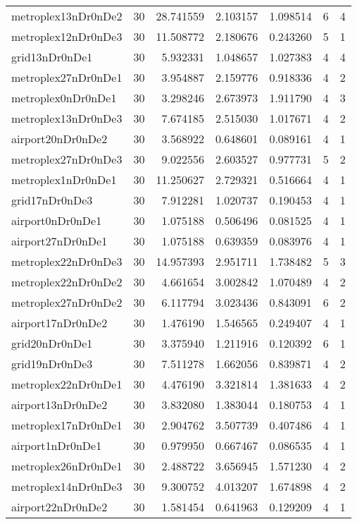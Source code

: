 \documentclass[../../../thesis.tex]{subfiles}
\begin{document}
\begin{longtable}{|l|r|r|r|r|r|r|}
metroplex13nDr0nDe2 & 30 & 28.741559 & 2.103157 & 1.098514 & 6 & 4 \\
metroplex12nDr0nDe3 & 30 & 11.508772 & 2.180676 & 0.243260 & 5 & 1 \\
grid13nDr0nDe1 & 30 & 5.932331 & 1.048657 & 1.027383 & 4 & 4 \\
metroplex27nDr0nDe1 & 30 & 3.954887 & 2.159776 & 0.918336 & 4 & 2 \\
metroplex0nDr0nDe1 & 30 & 3.298246 & 2.673973 & 1.911790 & 4 & 3 \\
metroplex13nDr0nDe3 & 30 & 7.674185 & 2.515030 & 1.017671 & 4 & 2 \\
airport20nDr0nDe2 & 30 & 3.568922 & 0.648601 & 0.089161 & 4 & 1 \\
metroplex27nDr0nDe3 & 30 & 9.022556 & 2.603527 & 0.977731 & 5 & 2 \\
metroplex1nDr0nDe1 & 30 & 11.250627 & 2.729321 & 0.516664 & 4 & 1 \\
grid17nDr0nDe3 & 30 & 7.912281 & 1.020737 & 0.190453 & 4 & 1 \\
airport0nDr0nDe1 & 30 & 1.075188 & 0.506496 & 0.081525 & 4 & 1 \\
airport27nDr0nDe1 & 30 & 1.075188 & 0.639359 & 0.083976 & 4 & 1 \\
metroplex22nDr0nDe3 & 30 & 14.957393 & 2.951711 & 1.738482 & 5 & 3 \\
metroplex22nDr0nDe2 & 30 & 4.661654 & 3.002842 & 1.070489 & 4 & 2 \\
metroplex27nDr0nDe2 & 30 & 6.117794 & 3.023436 & 0.843091 & 6 & 2 \\
airport17nDr0nDe2 & 30 & 1.476190 & 1.546565 & 0.249407 & 4 & 1 \\
grid20nDr0nDe1 & 30 & 3.375940 & 1.211916 & 0.120392 & 6 & 1 \\
grid19nDr0nDe3 & 30 & 7.511278 & 1.662056 & 0.839871 & 4 & 2 \\
metroplex22nDr0nDe1 & 30 & 4.476190 & 3.321814 & 1.381633 & 4 & 2 \\
airport13nDr0nDe2 & 30 & 3.832080 & 1.383044 & 0.180753 & 4 & 1 \\
metroplex17nDr0nDe1 & 30 & 2.904762 & 3.507739 & 0.407486 & 4 & 1 \\
airport1nDr0nDe1 & 30 & 0.979950 & 0.667467 & 0.086535 & 4 & 1 \\
metroplex26nDr0nDe1 & 30 & 2.488722 & 3.656945 & 1.571230 & 4 & 2 \\
metroplex14nDr0nDe3 & 30 & 9.300752 & 4.013207 & 1.674898 & 4 & 2 \\
airport22nDr0nDe2 & 30 & 1.581454 & 0.641963 & 0.129209 & 4 & 1 \\

\end{longtable}
\end{document}
